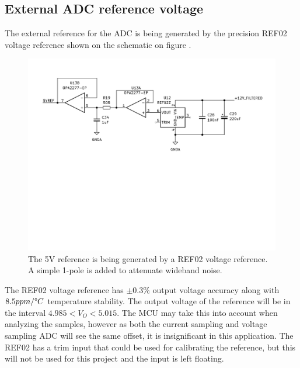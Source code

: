\subsection{External ADC reference voltage} \label{subsec:5VREF}

The  external reference for the ADC is being generated by the precision REF02 voltage reference shown on the schematic on figure . 

\begin{figure}[H]
    \centering
    \includegraphics[clip, trim=0 300 0 0, width=1\textwidth]{Sections/7_SystemDesign/Figures/7_1_3_REF.pdf}
    \caption{The 5V reference is being generated by a REF02 voltage reference\cite{REF02}. A simple 1-pole is added to attenuate wideband noise.}
    \label{fig_7_1_3_REF}
\end{figure}

The REF02 voltage reference has $\pm 0.3\%$ output voltage accuracy along with $8.5 ppm / \degree C$ temperature stability. The output voltage of the reference will be in the interval $4.985 < V_O < 5.015$. The MCU may take this into account when analyzing the samples, however as both the current sampling and voltage sampling ADC will see the same offset, it is insignificant in this application. The REF02 has a trim input that could be used for calibrating the reference, but this will not be used for this project and the input is left floating.

